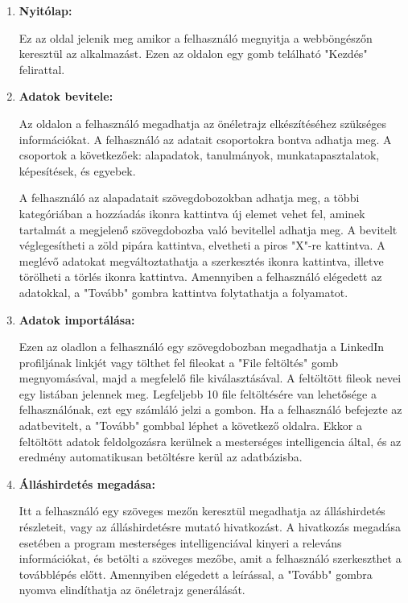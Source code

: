 \begin{enumerate}
    \item \textbf{Nyitólap:}

    Ez az oldal jelenik meg amikor a felhasználó megnyitja a webböngészőn keresztül az alkalmazást. Ezen az oldalon egy gomb telálható "Kezdés" felirattal.
    
    \item \textbf{Adatok bevitele:}

    Az oldalon a felhasználó megadhatja az önéletrajz elkészítéséhez szükséges információkat. A felhasználó az adatait csoportokra bontva adhatja meg. A csoportok a következőek: alapadatok, tanulmányok, munkatapasztalatok, képesítések, és egyebek.

    A felhasználó az alapadatait szövegdobozokban adhatja meg, a többi kategóriában a hozzáadás ikonra kattintva új elemet vehet fel, aminek tartalmát a megjelenő szövegdobozba való bevitellel adhatja meg. A bevitelt véglegesítheti a zöld pipára kattintva, elvetheti a piros "X"-re kattintva. A meglévő adatokat megváltoztathatja a szerkesztés ikonra kattintva, illetve törölheti a törlés ikonra kattintva. Amennyiben a felhasználó elégedett az adatokkal, a "Tovább" gombra kattintva folytathatja a folyamatot.

    \item \textbf{Adatok importálása:}

    Ezen az oladlon a felhasználó egy szövegdobozban megadhatja a LinkedIn profiljának linkjét vagy tölthet fel fileokat a "File feltöltés" gomb megnyomásával, majd a megfelelő file kiválasztásával. A feltöltött fileok nevei egy listában jelennek meg. Legfeljebb 10 file feltöltésére van lehetősége a felhasználónak, ezt egy számláló jelzi a gombon.  Ha a felhasználó befejezte az adatbevitelt, a "Tovább" gombbal léphet a következő oldalra. Ekkor a feltöltött adatok feldolgozásra kerülnek a mesterséges intelligencia által, és az eredmény automatikusan betöltésre kerül az adatbázisba.
    
    \item \textbf{Álláshirdetés megadása:}

    Itt a felhasználó egy szöveges mezőn keresztül megadhatja az álláshirdetés részleteit, vagy az álláshirdetésre mutató hivatkozást. A hivatkozás megadása esetében a program mesterséges intelligenciával kinyeri a releváns információkat, és betölti a szöveges mezőbe, amit a felhasználó szerkeszthet a továbblépés előtt. Amennyiben elégedett a leírással, a "Tovább" gombra nyomva elindíthatja az önéletrajz generálását.
    

\end{enumerate}
